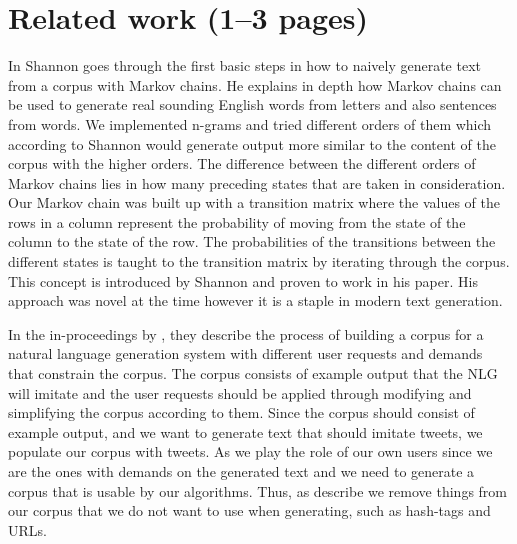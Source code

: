 \documentclass[a4paper,12pt]{article}
\begin{document}
\newpage
\section{Related work (1--3 pages)}
\label{sec:relwork}
%

In \cite{shannon48} Shannon goes through the first basic steps in how to naively generate text from a corpus with Markov chains. 
He explains in depth how Markov chains can be used to generate real sounding English words from letters and also sentences from words. 
We implemented n-grams and tried different orders of them which according to Shannon would generate output more similar to the content of the corpus with the higher orders. 
The difference between the different orders of Markov chains lies in how many preceding states that are taken in consideration.
Our Markov chain was built up with a transition matrix where the values of the rows in a column represent the probability of moving from the state of the column to the state of the row. The probabilities of the transitions between the different states is taught to the transition matrix by iterating through the corpus. This concept is introduced by Shannon and proven to work in his paper.
His approach was novel at the time however it is a staple in modern text generation. 


In the in-proceedings by \cite{Corpus}, they describe the process of building a corpus for a natural language generation system with different user requests and demands that constrain the corpus. 
The corpus consists of example output that the NLG will imitate and the user requests should be applied through modifying and simplifying the corpus according to them.
Since the corpus should consist of example output, and we want to generate text that should imitate tweets, we populate our corpus with tweets.
As we play the role of our own users since we are the ones with demands on the generated text and we need to generate a corpus that is usable by our algorithms. Thus, as \citep{Corpus} describe we remove things from our corpus that we do not want to use when generating, such as hash-tags and URLs.
\end{document}
